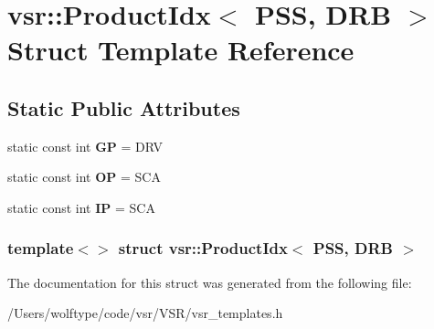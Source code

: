 \hypertarget{structvsr_1_1_product_idx_3_01_p_s_s_00_01_d_r_b_01_4}{\section{vsr\-:\-:Product\-Idx$<$ P\-S\-S, D\-R\-B $>$ Struct Template Reference}
\label{structvsr_1_1_product_idx_3_01_p_s_s_00_01_d_r_b_01_4}
}
\subsection*{Static Public Attributes}
\begin{DoxyCompactItemize}
\item 
\hypertarget{structvsr_1_1_product_idx_3_01_p_s_s_00_01_d_r_b_01_4_a68202b7a6645d6bce5f36cc359fd6751}{static const int {\bfseries G\-P} = D\-R\-V}\label{structvsr_1_1_product_idx_3_01_p_s_s_00_01_d_r_b_01_4_a68202b7a6645d6bce5f36cc359fd6751}

\item 
\hypertarget{structvsr_1_1_product_idx_3_01_p_s_s_00_01_d_r_b_01_4_a663cf57d23889e37570cc2019c002017}{static const int {\bfseries O\-P} = S\-C\-A}\label{structvsr_1_1_product_idx_3_01_p_s_s_00_01_d_r_b_01_4_a663cf57d23889e37570cc2019c002017}

\item 
\hypertarget{structvsr_1_1_product_idx_3_01_p_s_s_00_01_d_r_b_01_4_a3cee2792e1e25b5b7843807a54e41a02}{static const int {\bfseries I\-P} = S\-C\-A}\label{structvsr_1_1_product_idx_3_01_p_s_s_00_01_d_r_b_01_4_a3cee2792e1e25b5b7843807a54e41a02}

\end{DoxyCompactItemize}
\subsubsection*{template$<$$>$ struct vsr\-::\-Product\-Idx$<$ P\-S\-S, D\-R\-B $>$}



The documentation for this struct was generated from the following file\-:\begin{DoxyCompactItemize}
\item 
/\-Users/wolftype/code/vsr/\-V\-S\-R/vsr\-\_\-templates.\-h\end{DoxyCompactItemize}
